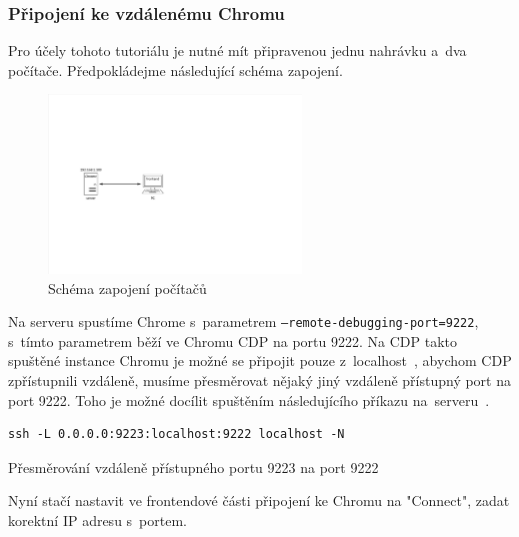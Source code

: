\documentclass[12pt, a4paper, twoside]{article}
\newcommand{\codefigureSpacing}{1.2}
\begin{document}
	\subsubsection{Připojení ke vzdálenému Chromu}
	\label{subsub_sec:remoteChrome}
	Pro účely tohoto tutoriálu je nutné mít připravenou jednu nahrávku a~dva počítače. Předpokládejme následující schéma zapojení. 
	\begin{figure}[H]
		\centering
		\includegraphics[width=0.6\textwidth]{remoteConnectionSchema.pdf}
		\caption{Schéma zapojení počítačů}
	\end{figure}
	Na serveru spustíme Chrome s~parametrem \texttt{--remote-debugging-port=9222}, s~tímto parametrem běží ve Chromu CDP na portu 9222. Na CDP takto spuštěné instance Chromu je možné se připojit pouze z~localhost~\cite{devtoolsProtocol}, abychom CDP zpřístupnili vzdáleně, musíme přesměrovat nějaký jiný vzdáleně přístupný port na port 9222. Toho je možné docílit spuštěním následujícího příkazu na~serveru~\cite{enableTrueRemoteDebuggingChrome}.
	\nopagebreak
	\begin{codefigure}[H]
		\renewcommand\baselinestretch{\codefigureSpacing}
		\begin{lstlisting}[style=MyHTML]
ssh -L 0.0.0.0:9223:localhost:9222 localhost -N
		\end{lstlisting}
		\caption{Přesměrování vzdáleně přístupného portu 9223 na port 9222}
	\end{codefigure}
	Nyní stačí nastavit ve frontendové části připojení ke Chromu na "Connect", zadat korektní IP adresu s~portem.
\end{document}
